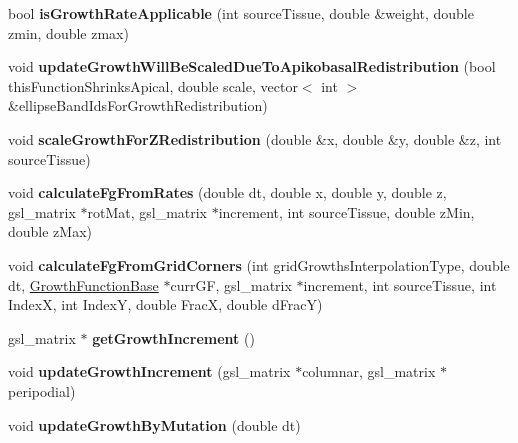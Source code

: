 \begin{DoxyCompactItemize}
\item 
\hypertarget{classShapeBase_aa0f0cc5b33f3e12d91a246cc591c346c}{}bool {\bfseries is\+Growth\+Rate\+Applicable} (int source\+Tissue, double \&weight, double zmin, double zmax)\label{classShapeBase_aa0f0cc5b33f3e12d91a246cc591c346c}

\item 
\hypertarget{classShapeBase_acf1aac4f2016af20eef30792a7f6693d}{}void {\bfseries update\+Growth\+Will\+Be\+Scaled\+Due\+To\+Apikobasal\+Redistribution} (bool this\+Function\+Shrinks\+Apical, double scale, vector$<$ int $>$ \&ellipse\+Band\+Ids\+For\+Growth\+Redistribution)\label{classShapeBase_acf1aac4f2016af20eef30792a7f6693d}

\item 
\hypertarget{classShapeBase_ab966b04161692d3026afe682ccf6826c}{}void {\bfseries scale\+Growth\+For\+Z\+Redistribution} (double \&x, double \&y, double \&z, int source\+Tissue)\label{classShapeBase_ab966b04161692d3026afe682ccf6826c}

\item 
\hypertarget{classShapeBase_a45508a35016a845b9c3b2d8f7d51479a}{}void {\bfseries calculate\+Fg\+From\+Rates} (double dt, double x, double y, double z, gsl\+\_\+matrix $\ast$rot\+Mat, gsl\+\_\+matrix $\ast$increment, int source\+Tissue, double z\+Min, double z\+Max)\label{classShapeBase_a45508a35016a845b9c3b2d8f7d51479a}

\item 
\hypertarget{classShapeBase_a23ed61e92393b0d7364a4a99ac0f77f9}{}void {\bfseries calculate\+Fg\+From\+Grid\+Corners} (int grid\+Growths\+Interpolation\+Type, double dt, \hyperlink{classGrowthFunctionBase}{Growth\+Function\+Base} $\ast$curr\+G\+F, gsl\+\_\+matrix $\ast$increment, int source\+Tissue, int Index\+X, int Index\+Y, double Frac\+X, double d\+Frac\+Y)\label{classShapeBase_a23ed61e92393b0d7364a4a99ac0f77f9}

\item 
\hypertarget{classShapeBase_acfee9abf0c9b00e278762688525ef333}{}gsl\+\_\+matrix $\ast$ {\bfseries get\+Growth\+Increment} ()\label{classShapeBase_acfee9abf0c9b00e278762688525ef333}

\item 
\hypertarget{classShapeBase_a009b5aed1c546db5e517f9f33f67b066}{}void {\bfseries update\+Growth\+Increment} (gsl\+\_\+matrix $\ast$columnar, gsl\+\_\+matrix $\ast$peripodial)\label{classShapeBase_a009b5aed1c546db5e517f9f33f67b066}

\item 
\hypertarget{classShapeBase_a466480b1e7de98250dd22c8cdb092d54}{}void {\bfseries update\+Growth\+By\+Mutation} (double dt)\label{classShapeBase_a466480b1e7de98250dd22c8cdb092d54}


\end{DoxyCompactItemize}
